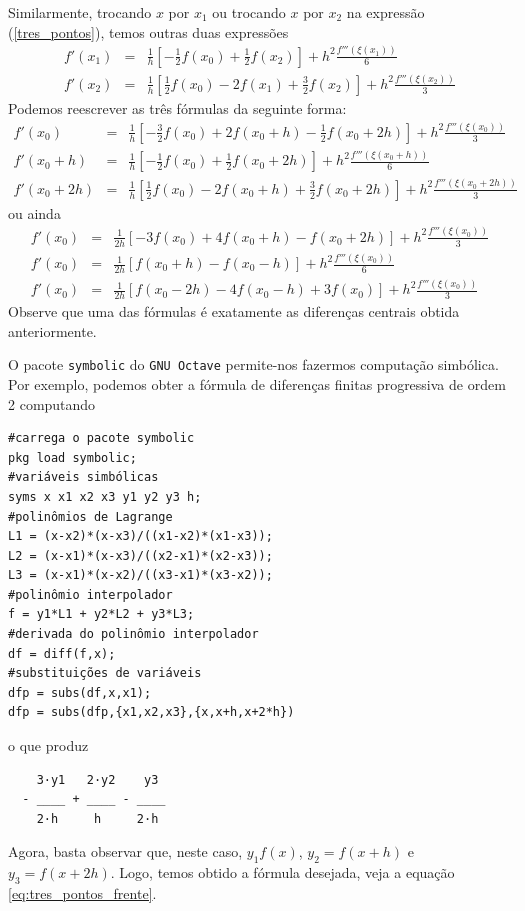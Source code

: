 Similarmente, trocando $x$ por $x_1$ ou trocando $x$ por $x_2$ na expressão (\ref{tres_pontos}), temos outras duas expressões
\begin{eqnarray*}
f'(x_1)&=&\frac{1}{h}\left[-\frac{1}{2}f(x_0)
+\frac{1}{2}f(x_{2})\right]+h^2\frac{f'''(\xi(x_1))}{6}\\
f'(x_2)&=&\frac{1}{h}\left[\frac{1}{2}f(x_0)-2f(x_{1})
+\frac{3}{2}f(x_{2})\right]+h^2\frac{f'''(\xi(x_2))}{3}
\end{eqnarray*}
Podemos reescrever as três fórmulas da seguinte forma:
\begin{eqnarray*}
f'(x_0)&=&\frac{1}{h}\left[-\frac{3}{2}f(x_0)+2f(x_{0}+h)
-\frac{1}{2}f(x_{0}+2h)\right]+h^2\frac{f'''(\xi(x_0))}{3}\\
f'(x_0+h)&=&\frac{1}{h}\left[-\frac{1}{2}f(x_0)
+\frac{1}{2}f(x_{0}+2h)\right]+h^2\frac{f'''(\xi(x_0+h))}{6}\\
f'(x_0+2h)&=&\frac{1}{h}\left[\frac{1}{2}f(x_0)-2f(x_{0}+h)
+\frac{3}{2}f(x_{0}+2h)\right]+h^2\frac{f'''(\xi(x_{0}+2h))}{3}
\end{eqnarray*}
ou ainda
\begin{eqnarray}
f'(x_0)&=&\frac{1}{2h}\left[-3f(x_0)+4f(x_{0}+h)
-f(x_{0}+2h)\right]+h^2\frac{f'''(\xi(x_0))}{3}\label{eq:tres_pontos_frente}\\
f'(x_0)&=&\frac{1}{2h}\left[f(x_{0}+h)-f(x_0-h)\right]+h^2\frac{f'''(\xi(x_0))}{6}\label{eq:tres_pontos_central}\\
f'(x_0)&=&\frac{1}{2h}\left[f(x_0-2h)-4f(x_{0}-h)
+3f(x_{0})\right]+h^2\frac{f'''(\xi(x_{0}))}{3}\label{eq:tres_pontos_traz}
\end{eqnarray}
Observe que uma das fórmulas é exatamente as diferenças centrais obtida anteriormente.

\ifisoctave
\begin{obs}
O pacote \verb+symbolic+ do \verb+GNU Octave+ permite-nos fazermos computação simbólica. Por exemplo, podemos obter a fórmula de diferenças finitas progressiva de ordem 2 computando
\begin{verbatim}
#carrega o pacote symbolic
pkg load symbolic;
#variáveis simbólicas
syms x x1 x2 x3 y1 y2 y3 h;
#polinômios de Lagrange
L1 = (x-x2)*(x-x3)/((x1-x2)*(x1-x3));
L2 = (x-x1)*(x-x3)/((x2-x1)*(x2-x3));
L3 = (x-x1)*(x-x2)/((x3-x1)*(x3-x2));
#polinômio interpolador
f = y1*L1 + y2*L2 + y3*L3;
#derivada do polinômio interpolador
df = diff(f,x);
#substituições de variáveis
dfp = subs(df,x,x1);
dfp = subs(dfp,{x1,x2,x3},{x,x+h,x+2*h})
\end{verbatim}
o que produz
\begin{verbatim}
    3·y1   2·y2    y3
  - ____ + ____ - ____
    2·h     h     2·h
\end{verbatim}
Agora, basta observar que, neste caso, $y_1 f(x)$, $y_2 = f(x+h)$ e $y_3 = f(x+2h)$. Logo, temos obtido a fórmula desejada, veja a equação \eqref{eq:tres_pontos_frente}.
\end{obs}
\fi

